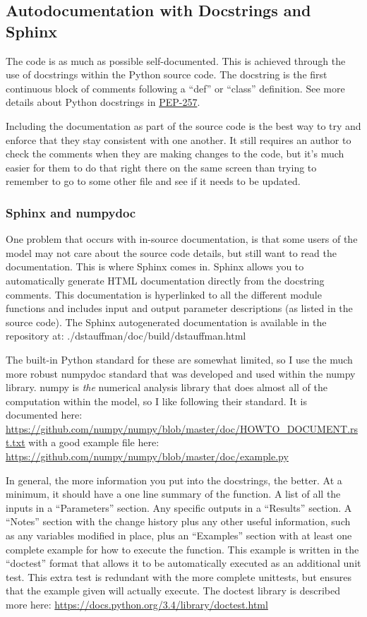 \documentclass[12pt]{article}
\begin{document}
\subsection{Autodocumentation with Docstrings and Sphinx}\label{h2:autodoc}
The code is as much as possible self-documented.  This is achieved through the use of docstrings within the Python source code.  The docstring is the first continuous block of comments following a ``def'' or ``class'' definition.  See more details about Python docstrings in \href{https://www.python.org/dev/peps/pep-0257/}{PEP-257}.

Including the documentation as part of the source code is the best way to try and enforce that they stay consistent with one another.  It still requires an author to check the comments when they are making changes to the code, but it's much easier for them to do that right there on the same screen than trying to remember to go to some other file and see if it needs to be updated.

\subsubsection{Sphinx and numpydoc}
One problem that occurs with in-source documentation, is that some users of the model may not care about the source code details, but still want to read the documentation.  This is where Sphinx comes in.  Sphinx allows you to automatically generate HTML documentation directly from the docstring comments.  This documentation is hyperlinked to all the different module functions and includes input and output parameter descriptions (as listed in the source code).  The Sphinx autogenerated documentation is available in the repository at: ./dstauffman/doc/build/dstauffman.html

The built-in Python standard for these are somewhat limited, so I use the much more robust numpydoc standard that was developed and used within the numpy library.  numpy is \emph{the} numerical analysis library that does almost all of the computation within the model, so I like following their standard.  It is documented here: \url{https://github.com/numpy/numpy/blob/master/doc/HOWTO_DOCUMENT.rst.txt} with a good example file here: \url{https://github.com/numpy/numpy/blob/master/doc/example.py}

In general, the more information you put into the docstrings, the better.  At a minimum, it should have a one line summary of the function.  A list of all the inputs in a ``Parameters'' section.  Any specific outputs in a ``Results'' section.  A ``Notes'' section with the change history plus any other useful information, such as any variables modified in place, plus an ``Examples'' section with at least one complete example for how to execute the function.  This example is written in the ``doctest'' format that allows it to be automatically executed as an additional unit test.  This extra test is redundant with the more complete unittests, but ensures that the example given will actually execute.  The doctest library is described more here: \url{https://docs.python.org/3.4/library/doctest.html}
\end{document}
